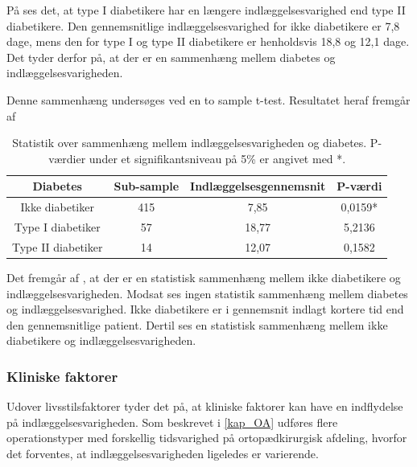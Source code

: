 \noindent
På  ses det, at type I diabetikere har en længere indlæggelsesvarighed end type II diabetikere. Den gennemsnitlige indlæggelsesvarighed for ikke diabetikere er 7,8 dage, mens den for type I og type II diabetikere er henholdsvis 18,8 og 12,1 dage. Det tyder derfor på, at der er en sammenhæng mellem diabetes og indlæggelsesvarigheden. 

Denne sammenhæng undersøges ved en to sample t-test. Resultatet heraf fremgår af 

\begin{table}[H]
\centering
\begin{tabular}{|c|c|c|c|}
\hline
\textbf{Diabetes}  & \textbf{Sub-sample} & \textbf{Indlæggelsesgennemsnit} & \textbf{P-værdi} \\ \hline
Ikke diabetiker    & 415                 & 7,85                            & 0,0159*          \\ \hline
Type I diabetiker  & 57                  & 18,77                           & 5,2136           \\ \hline
Type II diabetiker & 14                  & 12,07                           & 0,1582           \\ \hline
\end{tabular}
\caption{Statistik over sammenhæng mellem indlæggelsesvarigheden og diabetes. P-værdier under et signifikantsniveau på 5\% er angivet med *.}
\label{diabetesindlaegtab}
\end{table}

\noindent
Det fremgår af , at der er en statistisk sammenhæng mellem ikke diabetikere og indlæggelsesvarigheden. Modsat ses ingen statistik sammenhæng mellem diabetes og indlæggelsesvarighed. Ikke diabetikere er i gennemsnit indlagt kortere tid end den gennemsnitlige patient. Dertil ses en statistisk sammenhæng mellem ikke diabetikere og indlæggelsesvarigheden.

\subsubsection{Kliniske faktorer}
Udover livsstilsfaktorer tyder det på, at kliniske faktorer kan have en indflydelse på indlæggelsesvarigheden. Som beskrevet i \ref{kap_OA} udføres flere operationstyper med forskellig tidsvarighed på ortopædkirurgisk afdeling, hvorfor det forventes, at indlæggelsesvarigheden ligeledes er varierende. 



